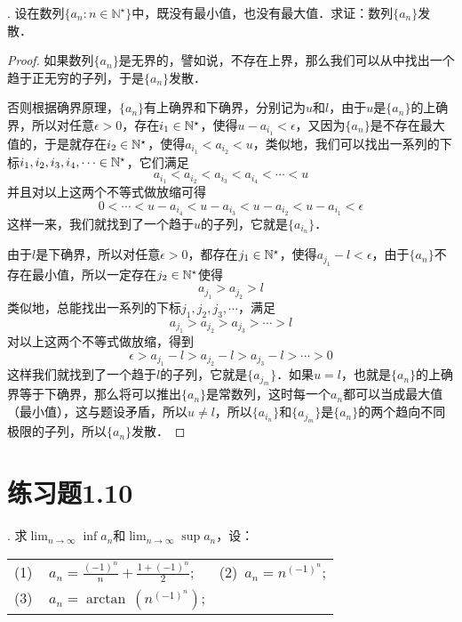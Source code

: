 . 设在数列$\{ a_n:n\in\mathbb{N}^\star\}$中，既没有最小值，也没有最大值．求证：数列$\{a_n\}$发散．
\begin{proof}
如果数列$\{ a_n \}$是无界的，譬如说，不存在上界，那么我们可以从中找出一个趋于正无穷的子列，于是$\{a_n \}$发散．

\noindent 否则根据确界原理，$\{a_n\}$有上确界和下确界，分别记为$u$和$l$，由于$u$是$\{ a_n \}$的上确界，所以对任意$\epsilon > 0$，存在$i_1 \in \mathbb{N}^\star$，使得$u - a_{i_1} < \epsilon$，又因为$\{ a_n \}$是不存在最大值的，于是就存在$i_2 \in \mathbb{N}^\star$，使得$a_{i_1} < a_{i_2} < u$，类似地，我们可以找出一系列的下标$i_1, i_2, i_3, i_4, \cdots \in \mathbb{N}^\star$，它们满足
\begin{equation}
    a_{i_1} < a_{i_2} < a_{i_3} < a_{i_4} < \cdots < u
\end{equation}
并且对以上这两个不等式做放缩可得
\begin{equation}
    0 < \cdots < u - a_{i_4} < u - a_{i_3} < u - a_{i_2} < u - a_{i_1} < \epsilon
\end{equation}
这样一来，我们就找到了一个趋于$u$的子列，它就是$\{ a_{i_n} \}$．

\noindent 由于$l$是下确界，所以对任意$\epsilon > 0$，都存在$j_1 \in \mathbb{N}^\star$，使得$a_{j_1} - l < \epsilon$，由于$\{ a_n \}$不存在最小值，所以一定存在$j_2 \in \mathbb{N}^\star$使得
\begin{equation}
    a_{j_1} > a_{j_2} > l
\end{equation}
类似地，总能找出一系列的下标$j_1, j_2, j_3, \cdots$，满足
\begin{equation}
    a_{j_1} > a_{j_2} > a_{j_3} > \cdots > l
\end{equation}
对以上这两个不等式做放缩，得到
\begin{equation}
    \epsilon > a_{j_1} - l > a_{j_2} - l > a_{j_3} - l > \cdots > 0
\end{equation}
这样我们就找到了一个趋于$l$的子列，它就是$\{ a_{j_m} \}$．如果$u = l$，也就是$\{ a_n \}$的上确界等于下确界，那么将可以推出$\{ a_n \}$是常数列，这时每一个$a_n$都可以当成最大值（最小值），这与题设矛盾，所以$u \neq l$，所以$\{ a_{i_n} \}$和$\{ a_{j_m} \}$是$\{ a_n \}$的两个趋向不同极限的子列，所以$\{ a_n \}$发散．
\end{proof}


\section*{练习题1.10}
. 求$\displaystyle\lim_{n\to \infty} \inf a_n$和$\displaystyle\lim_{n \to \infty} \sup a_n$，设：
\begin{table}[H]
    \centering
    \begin{tabularx}{0.8\textwidth} {  >{\raggedright\arraybackslash}X >{\raggedright\arraybackslash}X  }
       (1) ~ $a_n = \displaystyle \frac{(-1)^n}{n} + \frac{1+(-1)^n}{2}$; & (2)~$a_n=\displaystyle n^{(-1)^n}$; \\ [1em]
       (3) ~ $a_n = \arctan \, \left( n^{(-1)^n} \right)$;
      \end{tabularx}
\end{table}

